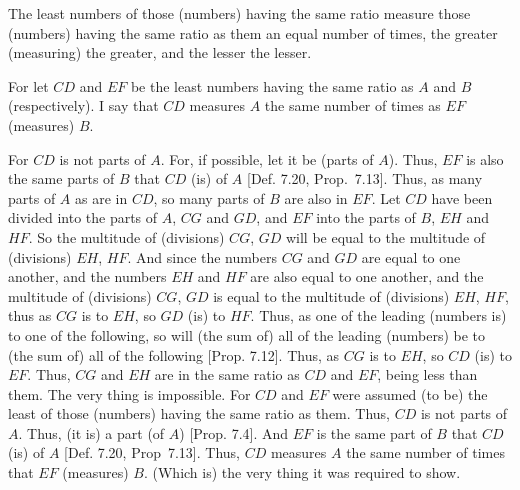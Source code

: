 \begin{Parallel}{}{}
{The  least numbers of those (numbers) having the
same ratio  measure those (numbers) having the same ratio as them an equal
number of times, the greater (measuring) the greater, and the lesser  the lesser.

For let $CD$ and $EF$ be the least numbers having the same ratio as $A$ and
$B$ (respectively). I say that $CD$ measures $A$ the same number of times
as $EF$ (measures) $B$.

\epsfysize=2in
\centerline{}

For $CD$ is not parts of $A$. For, if possible, let it be (parts of $A$). Thus,
$EF$ is also the same parts of $B$ that $CD$ (is) of $A$  [Def. 7.20, Prop.~7.13]. Thus, as many parts of $A$ as
are in $CD$, so many parts of $B$ are also in $EF$.  Let $CD$ have
been divided into the parts of $A$, $CG$ and $GD$, and $EF$ into the
parts of $B$, $EH$ and $HF$. So the multitude of (divisions) $CG$, $GD$
will be equal to the multitude of (divisions) $EH$, $HF$. And since the
numbers $CG$ and $GD$ are equal to one another, and the numbers
$EH$ and $HF$ are also equal to one another, and the multitude of (divisions)
$CG$, $GD$ is equal to the multitude of (divisions) $EH$, $HF$, thus as $CG$ is to $EH$, so
$GD$ (is) to $HF$. Thus,  as one of the
leading (numbers is) to one of the following, so will (the sum of) all
of the leading (numbers)  be  to (the sum of) all of the following [Prop. 7.12].  Thus, as $CG$ is to $EH$,
so $CD$ (is) to $EF$. Thus, $CG$ and $EH$ are in the same ratio as
$CD$ and $EF$, being less than them. The very thing is impossible. For
$CD$ and $EF$ were assumed (to be) the least of those (numbers) having
the same ratio as them. Thus, $CD$ is not parts of $A$. Thus, (it is) a
part (of $A$) [Prop. 7.4]. And $EF$ is the same part of $B$ that $CD$ (is) of $A$ [Def. 7.20, Prop~7.13]. Thus, $CD$ measures $A$ the same number of times that $EF$ (measures) $B$. (Which is) the very thing it was required to
show.}
\end{Parallel}

